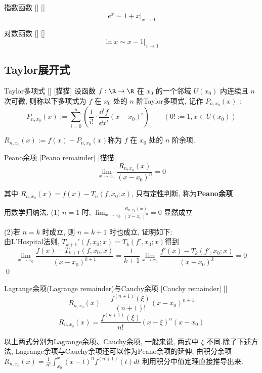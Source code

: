 \documentclass[UTF8]{ctexart}
\begin{document}
			\begin{xmp}
			    []
			    {指数函数}
			    []
			    []
				\[e^x\sim 1+x|_{x\to 0}\]
			\end{xmp}
			
			\begin{xmp}
			    []
			    {对数函数}
			    []
			    []
				\[\ln x\sim x-1|_{x\to 1}\]
			\end{xmp}
				
		\subsection{Taylor展开式}
			
			\begin{dfn}
			    []
			    {Taylor多项式}
			    []
			    [猫猫]
				设函数 \(f:\R\to\R\) 在 \(x_0\) 的一个邻域 \(U(x_0)\) 内连续且 \(n\) 次可微, 则称以下多项式为 \(f\) 在 \(x_0\) 处的 \(n\) 阶Taylor多项式, 记作 \(P_{n,x_0}(x)\) : 
				\[P_{n,x_0}(x):=\sum_{i=0}^n\left(\frac{1}{i!}\cdot\frac{\dd^i f}{{\dd x}^i}(x-x_0)^i\right)\qquad(0!:=1, x\in U(x_0))\]

				\(R_{n,x_0}(x):=f(x)-P_{n,x_0}(x)\)称为 \(f\) 在 \(x_0\) 处的 \(n\) 阶余项. 
			\end{dfn}
			
			\begin{thm}
			    []
			    {Peano余项}
			    [Peano remainder]
			    [猫猫]
				\[\lim_{x\to x_0}\frac{R_{n,x_0}(x)}{(x-x_0)^n}=0\]

				其中 \(R_{n,x_0}(x)=f(x)-T_n(f,x_0;x)\), 只有定性判断, 称为\textbf{Peano余项}
			\end{thm}
				
			\begin{prf}
				用数学归纳法,  (1) \(n=1\) 时, \(\lim_{x\to x_0}\frac{R_{n,x_0}(x)}{(x-x_0)^n}=0\) 显然成立

				(2)若 \(n=k\) 时成立, 则 \(n=k+1\) 时也成立, 证明如下: \\
				由L'Hospital法则, \(T_{k+1}'(f,x_0;x)=T_k(f',x_0;x)\)得到
				\[\lim_{x\to x_0}\frac{f(x)-T_{k+1}(f,x_0;x)}{(x-x_0)^{k+1}}=\frac{1}{k+1}\lim_{x\to x_0}\frac{f'(x)-T_k(f',x_0;x)}{(x-x_0)^k}=0\]
				\qed
			\end{prf}

			\begin{thm}
			    []
			    {Lagrange余项(Lagrange remainder)与Cauchy余项}
			    [Cauchy remainder]
			    []
				\[R_{n,x_0}(x)=\frac{f^{(n+1)}(\xi)}{(n+1)!}(x-x_0)^{n+1}\]
				\[R_{n,x_0}(x)=\frac{f^{(n+1)}(\xi)}{n!}(x-\xi)^n(x-x_0)\]

				以上两式分别为Lagrange余项、Cauchy余项, 一般来说, 两式中 \(\xi\) 不同.除了下述方法, Lagrange余项与Cauchy余项还可以作为Peano余项的延伸, 由积分余项 \(R_{n,x_0}(x)=\frac{1}{n!}\int_{x_0}^{x}(x-t)^nf^{(n+1)}(t)dt\) 利用积分中值定理直接推导出来.
			\end{thm}
\end{document}
